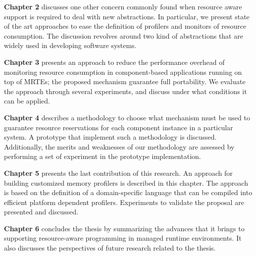 \textbf{Chapter 2} discusses one other concern commonly found when resource aware support is required to deal with new abstractions.
In particular, we present state of the art approaches to ease the definition of profilers and monitors of resource consumption.
The discussion revolves around two kind of abstractions that are widely used in developing software systems.

\textbf{Chapter 3} presents an approach to reduce the performance overhead of monitoring resource consumption in component-based applications running on top of MRTEs; the proposed mechanism guarantee full portability.
We evaluate the approach through several experiments, and discuss under what conditions it can be applied.

\textbf{Chapter 4} describes a methodology to choose what mechanism must be used to guarantee resource reservations for each component instance in a particular system.
A prototype that implement such a methodology is discussed.
Additionally, the merits and weaknesses of our methodology are assessed by performing a set of experiment in the prototype implementation.

\textbf{Chapter 5} presents the last contribution of this research.
An approach for building customized memory profilers is described in this chapter.
The approach is based on the definition of a domain-specific language that can be compiled into efficient platform dependent profilers.
Experiments to validate the proposal are presented and discussed.

\textbf{Chapter 6} concludes the thesis by summarizing the advances that it brings to supporting resource-aware programming in managed runtime environments.
It also discusses the perspectives of future research related to the thesis.

